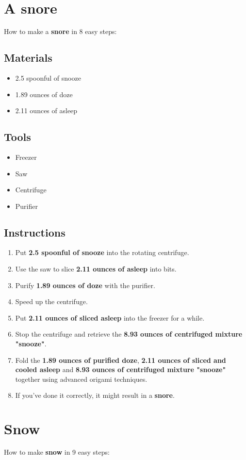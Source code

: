 \documentclass{article}
\begin{document}
\section{A snore}How to make a \textbf{snore} in 8 easy steps:

\subsection{Materials}\begin{itemize}
\item 
2.5 spoonful of snooze
\item 
1.89 ounces of doze
\item 
2.11 ounces of asleep
\end{itemize}
\subsection{Tools}\begin{itemize}
\item 
Freezer
\item 
Saw
\item 
Centrifuge
\item 
Purifier
\end{itemize}
\subsection{Instructions}\begin{enumerate}
\item 
Put \textbf{2.5 spoonful of snooze} into the rotating centrifuge.
\item 
Use the saw to slice \textbf{2.11 ounces of asleep} into bits.
\item 
Purify \textbf{1.89 ounces of doze} with the purifier.
\item 
Speed up the centrifuge.
\item 
Put \textbf{2.11 ounces of sliced asleep} into the freezer for a while.
\item 
Stop the centrifuge and retrieve the \textbf{8.93 ounces of centrifuged mixture "snooze"}.
\item 
Fold the \textbf{1.89 ounces of purified doze}, \textbf{2.11 ounces of sliced and cooled asleep} and \textbf{8.93 ounces of centrifuged mixture "snooze"} together using advanced origami techniques.
\item 
If you've done it correctly, it might result in a \textbf{snore}.
\end{enumerate}
\newpage
\section{Snow}How to make \textbf{snow} in 9 easy steps:
\end{document}
